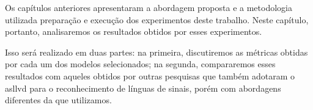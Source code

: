 Os capítulos anteriores apresentaram a abordagem proposta e a metodologia utilizada preparação e execução dos experimentos deste trabalho.
Neste capítulo, portanto, analisaremos os resultados obtidos por esses experimentos.

Isso será realizado em duas partes: 
na primeira, discutiremos as métricas obtidas por cada um dos modelos selecionados; na segunda, compararemos esses resultados com aqueles obtidos por outras pesquisas que também adotaram o \acrfull{asllvd} para o reconhecimento de línguas de sinais, porém com abordagens diferentes da que utilizamos.